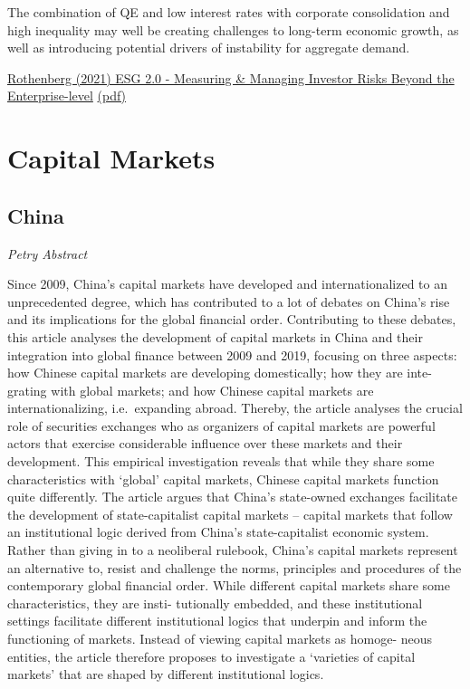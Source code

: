 \documentclass[
]{book}
\begin{document}
The combination of QE and low interest rates with corporate consolidation and high
inequality may well be creating challenges to long-term economic growth,
as well as introducing
potential drivers of instability for aggregate demand.

\href{https://papers.ssrn.com/sol3/papers.cfm?abstract_id=3820316}{Rothenberg (2021) ESG 2.0 - Measuring \& Managing Investor Risks Beyond the Enterprise-level}
\href{Rothenberg_2021_ESG2.pdf}{(pdf)}

\hypertarget{capital-markets}{%
\chapter{Capital Markets}\label{capital-markets}}

\hypertarget{china}{%
\section{China}\label{china}}

\emph{Petry Abstract}

Since 2009, China's capital markets have developed and internationalized to an unprecedented
degree, which has contributed to a lot of debates on China's rise and its implications for the
global financial order. Contributing to these debates, this article analyses the development of
capital markets in China and their integration into global finance between 2009 and 2019, focusing
on three aspects: how Chinese capital markets are developing domestically; how they are inte-
grating with global markets; and how Chinese capital markets are internationalizing, i.e.~expanding
abroad. Thereby, the article analyses the crucial role of securities exchanges who as organizers of
capital markets are powerful actors that exercise considerable influence over these markets and
their development. This empirical investigation reveals that while they share some characteristics
with `global' capital markets, Chinese capital markets function quite differently. The article argues
that China's state-owned exchanges facilitate the development of state-capitalist capital markets --
capital markets that follow an institutional logic derived from China's state-capitalist economic
system. Rather than giving in to a neoliberal rulebook, China's capital markets represent an
alternative to, resist and challenge the norms, principles and procedures of the contemporary
global financial order. While different capital markets share some characteristics, they are insti-
tutionally embedded, and these institutional settings facilitate different institutional logics that
underpin and inform the functioning of markets. Instead of viewing capital markets as homoge-
neous entities, the article therefore proposes to investigate a `varieties of capital markets' that are
shaped by different institutional logics.
\end{document}
